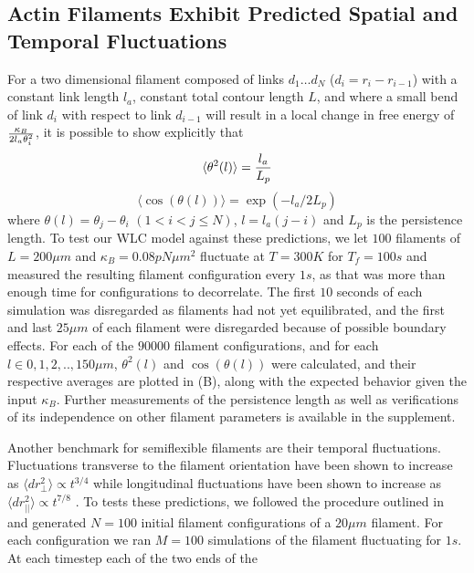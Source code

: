 \documentclass[12pt]{article}
\begin{document}
\subsection{Actin Filaments Exhibit Predicted Spatial and Temporal Fluctuations}
For a two dimensional filament composed of links $d_1\ldots d_N$ ($d_i = r_i - r_{i-1}$) 
with a constant link length $l_a$, constant total contour length $L$, and where a small bend of link
$d_i$ with respect to link $d_{i-1}$ will result in a local change in free energy of ${\kappa_B\over2l_a\theta_i^2}$, it
is possible to show explicitly that \cite{frontali1979}
\begin{equation}
  \langle\theta^2(l)\rangle = {l_a\over L_p}
  \label{eqn:thsq}
\end{equation}
\begin{equation} 
  \langle\cos(\theta(l))\rangle = \exp{(-l_a/2L_p)}
  \label{eqn:costh}
\end{equation} 
where $\theta(l) = \theta_j - \theta_i$ $(1<i<j\le N)$, $l = l_a(j-i)$ and $L_p$ is the persistence length. 
To test our WLC model against these predictions, we let $100$ filaments of $L=200\mu m$ and $\kappa_B=0.08 pN\mu m^2$ fluctuate at
$T=300K$ for $T_f = 100s$ and measured the resulting filament configuration every $1s$, as that was more than enough
time for configurations to decorrelate. The first $10$ seconds of each simulation was disregarded as filaments had not
yet equilibrated, and the first and last $25\mu m$ of each filament were disregarded because of possible boundary
effects. 
For each of the $90000$ filament configurations, and for each $l\in{0,1,2,..,150}\mu m$,
$\theta^2(l)$ and $\cos(\theta(l))$ were calculated, and their respective averages are plotted in 
(B), along with the expected behavior given the input $\kappa_B$.  
Further measurements of the persistence length as well as verifications of its independence on
other filament parameters is available in the supplement.
\par
Another benchmark for semiflexible filaments are their temporal fluctuations.
Fluctuations transverse to the filament orientation have been 
shown to increase as $\langle dr_{\perp}^2\rangle\propto t^{3/4}$ while 
longitudinal fluctuations have been shown to increase as
$\langle dr_{||}^2\rangle\propto t^{7/8}$ \cite{everaers1999}. To tests these predictions, we followed the procedure outlined in
\cite{everaers1999} and generated $N = 100$ initial filament configurations of a $20\mu m$ filament. For each configuration
we ran $M = 100$ simulations of the filament fluctuating for $1s$. At each timestep each of the two ends of the
\end{document}
